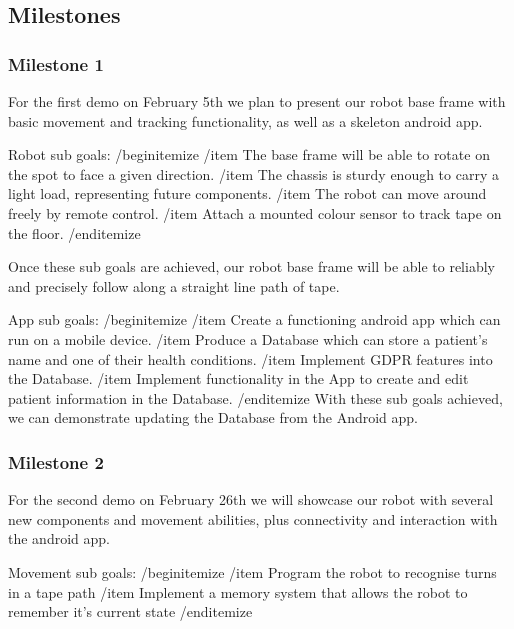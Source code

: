 \documentclass{article}
\begin{document}
\subsection{Milestones} 

\subsubsection{Milestone 1}

For the first demo on February 5th we plan to present our robot base frame with basic movement and tracking functionality, as well as a skeleton android app.

Robot sub goals:
/begin{itemize}
/item The base frame will be able to rotate on the spot to face a given direction.
/item The chassis is sturdy enough to carry a light load, representing future components.
/item The robot can move around freely by remote control.
/item Attach a mounted colour sensor to track tape on the floor.  
/end{itemize}


Once these sub goals are achieved, our robot base frame will be able to reliably and precisely follow along a straight line path of tape. 

App sub goals:
/begin{itemize}
/item Create a functioning android app which can run on a mobile device.
/item Produce a Database which can store a patient's name and one of their health conditions.
/item Implement GDPR features into the Database.
/item Implement functionality in the App to create and edit patient information in the Database.
/end{itemize}
With these sub goals achieved, we can demonstrate updating the Database from the Android app.

\subsubsection{Milestone 2}

For the second demo on February 26th we will showcase our robot with several new components and movement abilities, plus connectivity and interaction with the android app.  

Movement sub goals:
/begin{itemize}
/item Program the robot to recognise turns in a tape path
/item Implement a memory system that allows the robot to remember it's current state 
/end{itemize}
\end{document}
